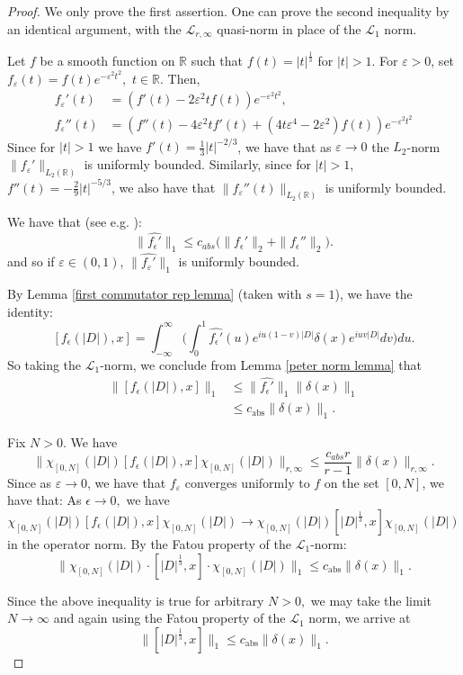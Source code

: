     \begin{proof} 
        We only prove the first assertion. One can prove the second inequality by an identical argument, with the $\mathcal{L}_{r,\infty}$ quasi-norm in place of the $\mathcal{L}_1$ norm.

        Let $f$ be a smooth function on $\mathbb{R}$ such that $f(t)=|t|^{\frac13}$ for $|t|>1.$ For $\varepsilon > 0$, set $f_{\varepsilon}(t)=f(t)e^{-\varepsilon^2t^2},$
        $t\in\mathbb{R}.$ Then,
        \begin{align*}
               f_\varepsilon'(t) &= (f'(t)-2\varepsilon^2tf(t))e^{-\varepsilon^2t^2},\\
            f_{\varepsilon}''(t) &= (f''(t)-4\varepsilon^2tf'(t)+(4t\varepsilon^4-2\varepsilon^2)f(t))e^{-\varepsilon^2t^2}
        \end{align*}
        Since for $|t| > 1$ we have $f'(t) = \frac{1}{3}|t|^{-2/3}$, we have that as $\varepsilon \to 0$ the $L_2$-norm
        $\|f_\varepsilon'\|_{L_2(\mathbb{R})}$ is uniformly bounded. Similarly, since for $|t| > 1$, $f''(t) = -\frac{2}{9}|t|^{-5/3}$, we
        also have that $\|f_{\varepsilon}''(t)\|_{L_2(\mathbb{R})}$ is uniformly bounded.
        
        We have that (see e.g. \cite[Lemma 7]{PS-crelle}):
        $$\|\widehat{f_{\epsilon}'}\|_1\leq c_{abs}\Big(\|f_{\epsilon}'\|_2+\|f_{\epsilon}''\|_2\Big).$$
        and so if $\varepsilon \in(0,1)$, $\|\widehat{f_{\varepsilon}'}\|_1$ is uniformly bounded.

        By Lemma \ref{first commutator rep lemma} (taken with $s=1$), we have the identity:
        $$[f_{\epsilon}(|D|),x]=\int_{-\infty}^{\infty}\Big(\int_0^1\hat{f_{\epsilon}'}(u)e^{iu(1-v)|D|}\delta(x)e^{iuv|D|}dv\Big)du.$$
        So taking the $\mathcal{L}_1$-norm, we conclude from Lemma \ref{peter norm lemma} that
        \begin{align*}
            \Big\|[f_{\epsilon}(|D|),x]\Big\|_{1} &\leq \|\hat{f_{\epsilon}'}\|_1\|\delta(x)\|_{1}\\
                                                  &\leq c_{\mathrm{abs}}\|\delta(x)\|_{1}.
        \end{align*}

        Fix $N>0.$ We have
        $$\Big\|\chi_{[0,N]}(|D|)[f_{\epsilon}(|D|),x]\chi_{[0,N]}(|D|)\Big\|_{r,\infty}\leq\frac{c_{abs}r}{r-1}\|\delta(x)\|_{r,\infty}.$$
        Since as $\varepsilon \to 0$, we have that $f_{\varepsilon}$ converges uniformly to $f$ on the set $[0,N]$, we have that:
        As $\epsilon\to0,$ we have
        $$\chi_{[0,N]}(|D|)[f_{\epsilon}(|D|),x]\chi_{[0,N]}(|D|)\to \chi_{[0,N]}(|D|)[|D|^{\frac13},x]\chi_{[0,N]}(|D|)$$
        in the operator norm. By the Fatou property of the $\mathcal{L}_1$-norm:
        $$\Big\|\chi_{[0,N]}(|D|)\cdot[|D|^{\frac13},x]\cdot\chi_{[0,N]}(|D|)\Big\|_{1} \leq c_{\mathrm{abs}}\|\delta(x)\|_{1}.$$

        Since the above inequality is true for arbitrary $N>0,$ we may take the limit $N\to\infty$ and again using the Fatou property of the $\mathcal{L}_1$ norm, we arrive at
        $$\Big\|[|D|^{\frac13},x]\Big\|_{1}\leq c_{\mathrm{abs}}\|\delta(x)\|_{1}.$$
    \end{proof}

